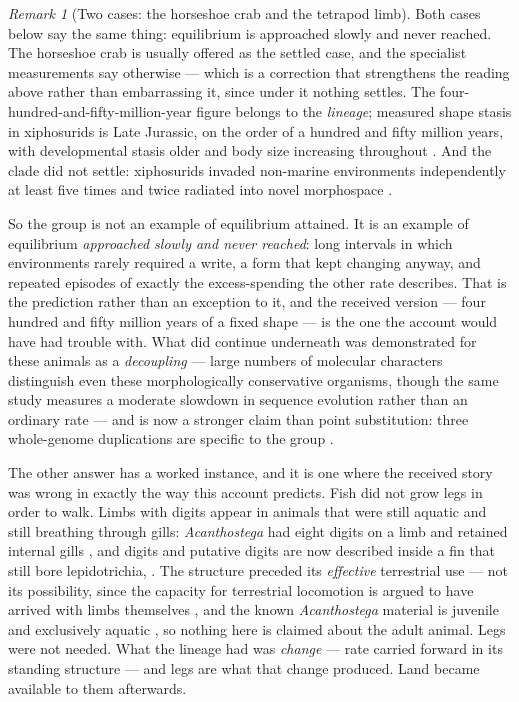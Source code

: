 \documentclass[11pt,a4paper]{article}
\theoremstyle{remark}
\newtheorem{remark}[definition]{Remark}
\begin{document}
\begin{remark}[Two cases: the horseshoe crab and the tetrapod limb]\label{rem:two-cases}
Both cases below say the same thing: equilibrium is approached slowly and never reached.
The horseshoe crab is usually offered as the settled case, and the specialist measurements say
otherwise --- which is a correction that strengthens the reading above rather than embarrassing it,
since under it nothing settles. The
four-hundred-and-fifty-million-year figure belongs to the \emph{lineage}; measured shape stasis in
xiphosurids is Late Jurassic, on the order of a hundred and fifty million years, with developmental
stasis older and body size increasing throughout \citep{bicknell2022}. And the clade did not settle:
xiphosurids invaded non-marine environments independently at least five times and twice radiated into
novel morphospace \citep{lamsdell2016}.

So the group is not an example of equilibrium attained. It is an example of equilibrium
\emph{approached slowly and never reached}: long intervals in which environments rarely required a
write, a form that kept changing anyway, and repeated episodes of exactly the excess-spending the
other rate describes. That is the prediction rather than an exception to it, and the received
version --- four hundred and fifty million years of a fixed shape --- is the one the account would
have had trouble with. What did continue underneath was demonstrated for these animals as a
\emph{decoupling} --- large numbers of molecular characters distinguish even these morphologically
conservative organisms, though the same study measures a moderate slowdown in sequence evolution
rather than an ordinary rate \citep{avise1994} --- and is now a stronger claim than point substitution: three
whole-genome duplications are specific to the group \citep{nong2021,castellano2025}.

The other answer has a worked instance, and it is one where the received story was wrong in exactly
the way this account predicts. Fish did not grow legs in order to walk. Limbs with digits appear in
animals that were still aquatic and still breathing through gills: \emph{Acanthostega} had eight
digits on a limb \citep{coatesclack1990} and retained internal gills
\citep{coatesclack1991,clack2012}, and digits and putative digits are now described inside a fin that
still bore lepidotrichia,  \citep{cloutier2020}. The structure
preceded its \emph{effective} terrestrial use --- not its possibility, since the capacity for
terrestrial locomotion is argued to have arrived with limbs themselves \citep{dickson2021}, and the
known \emph{Acanthostega} material is juvenile and exclusively aquatic \citep{sanchez2016}, so
nothing here is claimed about the adult animal. Legs were not needed. What the lineage had was \emph{change} ---
rate carried forward in its standing structure --- and legs are what that change produced. Land became
available to them afterwards.


\end{remark}
\end{document}
